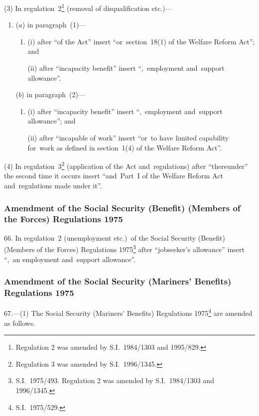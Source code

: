 \documentclass[12pt,a4paper]{article}
\begin{document}
(3) In regulation~2\footnote{Regulation 2 was amended by S.I.~1984/1303 and 1995/829.} (removal of disqualification etc.)---
\begin{enumerate}\item[]
($a$) in paragraph~(1)—
\begin{enumerate}\item[]
(i) after “of the Act” insert “or~section~18(1) of the Welfare Reform Act”; and

(ii) after “incapacity benefit” insert “,~employment and~support allowance”.
\end{enumerate}

($b$) in paragraph~(2)—
\begin{enumerate}\item[]
(i) after “incapacity benefit” insert “,~employment and~support allowance”; and

(ii) after “incapable of work” insert “or~to have limited capability for~work as defined in section~1(4) of the Welfare Reform Act”.
\end{enumerate}
\end{enumerate}

(4) In regulation~3\footnote{Regulation 3 was amended by S.I.~1996/1345.} (application of the Act and~regulations) after “thereunder” the second time it occurs insert “and~Part~I of the Welfare Reform Act and~regulations made under it”.

\subsubsection[66. Amendment of the Social Security (Benefit) (Members of the Forces) Regulations 1975]{\sloppy Amendment of the Social Security (Benefit) (Members of the Forces) Regulations 1975}

66.  In regulation~2 (unemployment etc.)\ of the Social Security (Benefit) (Members of the Forces) Regulations 1975\footnote{S.I.~1975/493. Regulation 2 was amended by S.I.~1984/1303 and 1996/1345.} after “jobseeker’s allowance” insert “,~an employment and~support allowance”.

\subsubsection[67. Amendment of the Social Security (Mariners’ Benefits) Regulations 1975]{Amendment of the Social Security (Mariners’ Benefits) Regulations 1975}

67.---(1)  The Social Security (Mariners’ Benefits) Regulations 1975\footnote{S.I.~1975/529.} are amended as follows.
\end{document}
